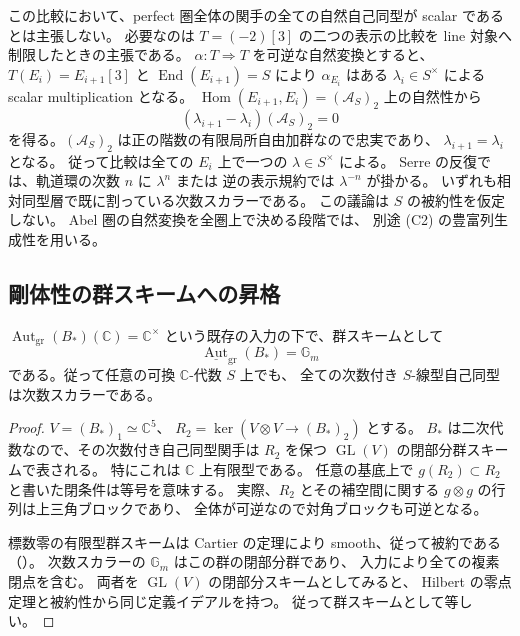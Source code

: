 \begin{remark}
\label{rem:relative-serre-scalar-on-lines}
この比較において、perfect 圏全体の関手の全ての自然自己同型が
scalar であるとは主張しない。
必要なのは $T=(-2)[3]$ の二つの表示の比較を line 対象へ制限したときの主張である。
$\alpha:T\Rightarrow T$ を可逆な自然変換とすると、
$T(E_i)=E_{i+1}[3]$ と $\operatorname{End}(E_{i+1})=S$ により
$\alpha_{E_i}$ はある $\lambda_i\in S^\times$ による scalar multiplication となる。
$\operatorname{Hom}(E_{i+1},E_i)=(\mathcal A_S)_2$ 上の自然性から
\[
 (\lambda_{i+1}-\lambda_i)(\mathcal A_S)_2=0
\]
を得る。$(\mathcal A_S)_2$ は正の階数の有限局所自由加群なので忠実であり、
$\lambda_{i+1}=\lambda_i$ となる。
従って比較は全ての $E_i$ 上で一つの $\lambda\in S^\times$ による。
Serre の反復では、軌道環の次数 $n$ に $\lambda^{n}$ または
逆の表示規約では $\lambda^{-n}$ が掛かる。
いずれも相対同型層で既に割っている次数スカラーである。
この議論は $S$ の被約性を仮定しない。
Abel 圏の自然変換を全圏上で決める段階では、
別途 \textup{(C2)} の豊富列生成性を用いる。
\end{remark}

\subsection{剛体性の群スキームへの昇格}

\begin{lemma}[周囲の次数付き自己同型群スキーム]
\label{lem:rigid-ambient-group-scheme}
$\operatorname{Aut}_{\mathrm{gr}}(B_*)(\mathbb C)=\mathbb C^\times$
という既存の入力の下で、群スキームとして
\[
 \underline{\operatorname{Aut}}_{\mathrm{gr}}(B_*)=\mathbb G_m
\]
である。従って任意の可換 $\mathbb C$-代数 $S$ 上でも、
全ての次数付き $S$-線型自己同型は次数スカラーである。
\end{lemma}

\begin{proof}
$V=(B_*)_1\simeq\mathbb C^5$、
$R_2=\ker(V\otimes V\to(B_*)_2)$ とする。
$B_*$ は二次代数なので、その次数付き自己同型関手は
$R_2$ を保つ $\operatorname{GL}(V)$ の閉部分群スキームで表される。
特にこれは $\mathbb C$ 上有限型である。
任意の基底上で $g(R_2)\subset R_2$ と書いた閉条件は等号を意味する。
実際、$R_2$ とその補空間に関する $g\otimes g$ の行列は上三角ブロックであり、
全体が可逆なので対角ブロックも可逆となる。

標数零の有限型群スキームは Cartier の定理により smooth、従って被約である
（\cite[Lemma~39.8.2, Tag~\texttt{047N}]{StacksRelativeDuality}）。
次数スカラーの $\mathbb G_m$ はこの群の閉部分群であり、
入力により全ての複素閉点を含む。
両者を $\operatorname{GL}(V)$ の閉部分スキームとしてみると、
Hilbert の零点定理と被約性から同じ定義イデアルを持つ。
従って群スキームとして等しい。
\end{proof}

